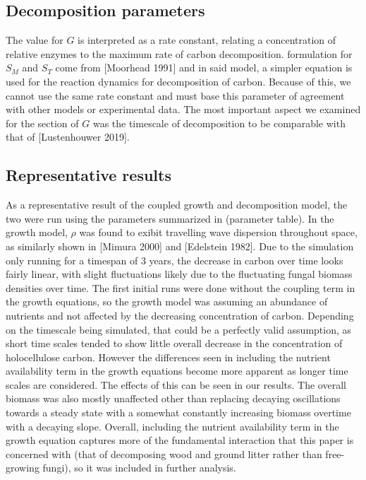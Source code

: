 \documentclass[12pt]{article}
\begin{document}
\begin{multicols}{2}

\subsection*{Decomposition parameters}
The value for $G$ is interpreted as a rate constant, relating a concentration of relative enzymes to the maximum rate of carbon decomposition. formulation for $S_{M}$ and $S_{T}$ come from [Moorhead 1991] and in said model, a simpler equation is used for the reaction dynamics for decomposition of carbon. Because of this, we cannot use the same rate constant and must base this parameter of agreement with other models or experimental data. The most important aspect we examined for the section of $G$ was the timescale of decomposition to be comparable with that of [Lustenhouwer 2019].
\subsection*{Representative results}
As a representative result of the coupled growth and decomposition model, the two were run using the parameters summarized in (parameter table). In the growth model, $\rho$ was found to exibit travelling wave dispersion throughout space, as similarly shown in [Mimura 2000] and [Edelstein 1982]. Due to the simulation only running for a timespan of 3 years, the decrease in carbon over time looks fairly linear, with slight fluctuations likely due to the fluctuating fungal biomass densities over time. The first initial runs were done without the coupling term in the growth equations, so the growth model was assuming an abundance of nutrients and not affected by the decreasing concentration of carbon. Depending on the timescale being simulated, that could be a perfectly valid assumption, as short time scales tended to show little overall decrease in the concentration of holocellulose carbon. However the differences seen in including the nutrient availability term in the growth equations become more apparent as longer time scales are considered. The effects of this can be seen in our results. The overall biomass was also mostly unaffected other than replacing decaying oscillations towards a steady state with a somewhat constantly increasing biomass overtime with a decaying slope. Overall, including the nutrient availability term in the growth equation captures more of the fundamental interaction that this paper is concerned with (that of decomposing wood and ground litter rather than free-growing fungi), so it was included in further analysis. 



\end{multicols}
\end{document}
